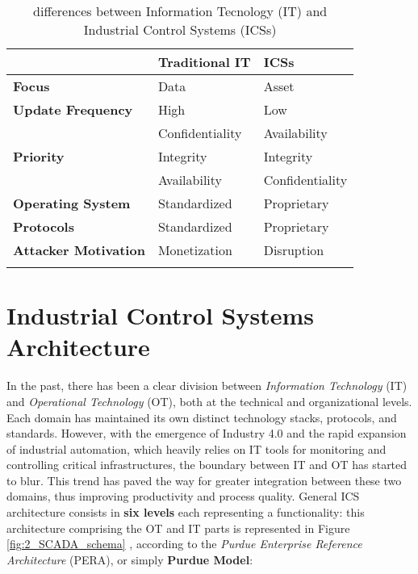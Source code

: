 \bigskip
\begin{longtable}[c]{p{}  p{}  p{}}
	\hline
	& \textbf{Traditional IT} & \textbf{ICSs} \\ [0.5ex] 
	\hline
	\textbf{Focus} & Data & Asset \\
	\hline
	\textbf{Update Frequency} & High & Low \\
	\hline 
	\multirow{3}{4em}{\textbf{Priority}} & Confidentiality & Availability \\
	& Integrity & Integrity \\
	& Availability & Confidentiality \\
	\hline
	\textbf{Operating System} & Standardized & Proprietary \\
	\hline
	\textbf{Protocols} & Standardized & Proprietary \\
	\hline
	\textbf{Attacker Motivation} & Monetization & Disruption \\
	\hline
	
	\caption{differences between Information Tecnology (IT) and Industrial Control Systems (ICSs)}
	\label{table:2_it_ot_difference}
\end{longtable}
\vfill

\section{Industrial Control Systems Architecture}
\label{sec:2_ics_components}
In the past, there has been a clear division between \textit{Information Technology} (IT) and \textit{Operational Technology} (OT), both at the technical and organizational levels. Each domain has maintained its own distinct technology stacks, protocols, and standards. However, with the emergence of Industry 4.0 and the rapid expansion of industrial automation, which heavily relies on IT tools for monitoring and controlling critical infrastructures, the boundary between IT and OT has started to blur. This trend has paved the way for greater integration between these two domains, thus improving productivity and process quality.\newline \newline
General ICS architecture consists in \textbf{six levels} each representing a functionality: this architecture comprising the OT and IT parts is represented in Figure \ref{fig:2_SCADA_schema} \cite{purdue_model}\cite{tesi_phd_norvegese}, according to the \textit{Purdue Enterprise Reference Architecture} (PERA), or simply \textbf{Purdue Model}:

